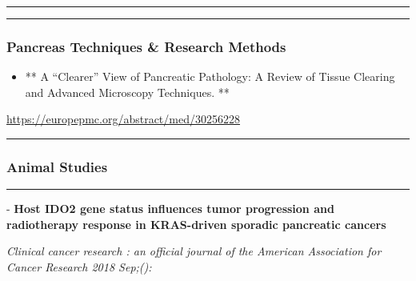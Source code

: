 \documentclass[]{article}
\providecommand{\tightlist}{%
  \setlength{\itemsep}{0pt}\setlength{\parskip}{0pt}}
\begin{document}
{}

{}

\begin{center}\rule{0.5\linewidth}{\linethickness}\end{center}

\begin{center}\rule{0.5\linewidth}{\linethickness}\end{center}

\hypertarget{pancreas-techniques-research-methods}{%
\subsubsection{Pancreas Techniques \& Research
Methods}\label{pancreas-techniques-research-methods}}

\begin{itemize}
\tightlist
\item
  ** A ``Clearer'' View of Pancreatic Pathology: A Review of Tissue
  Clearing and Advanced Microscopy Techniques. **
\end{itemize}

\url{https://europepmc.org/abstract/med/30256228}

\begin{center}\rule{0.5\linewidth}{\linethickness}\end{center}

\hypertarget{animal-studies}{%
\subsubsection{Animal Studies}\label{animal-studies}}

\begin{center}\rule{0.5\linewidth}{\linethickness}\end{center}

 - \textbf{Host IDO2 gene status influences tumor progression and
radiotherapy response in KRAS-driven sporadic pancreatic cancers}

\emph{Clinical cancer research : an official journal of the American
Association for Cancer Research 2018 Sep;():}
\end{document}
